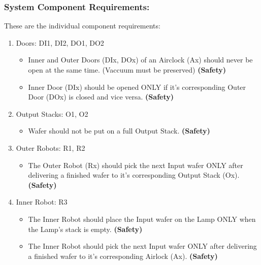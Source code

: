 \documentclass[a4paper,12pt]{article}
\begin{document}
\subsubsection{System Component Requirements:}
These are the individual component requirements:
\begin{enumerate}
\item Doors: DI1, DI2, DO1, DO2
	\begin{itemize}
	\item Inner and Outer Doors  (DIx, DOx) of an Airclock (Ax) should never be open at the same time. (Vaccuum must be preserved) \textbf{ (Safety)}
	\item Inner Door (DIx) should be opened ONLY if it's corresponding Outer Door (DOx) is closed and vice versa. \textbf{ (Safety)}
	\end{itemize}

\item Output Stacks: O1, O2
	\begin{itemize}
	\item Wafer should not be put on a full Output Stack.\textbf{ (Safety)}
	\end{itemize}

\item Outer Robots: R1, R2
	\begin{itemize}
	\item The Outer Robot (Rx) should pick the next Input wafer ONLY after delivering a finished wafer to it's corresponding Output Stack (Ox).\textbf{ (Safety)}
	\end{itemize}

\item Inner Robot: R3
	\begin{itemize}
	\item The Inner Robot should place the Input wafer on the Lamp ONLY when the Lamp's stack is empty.\textbf{ (Safety)}
	\item The Inner Robot should pick the next Input wafer ONLY after delivering a finished wafer to it's corresponding Airlock (Ax).\textbf{ (Safety)}
	\end{itemize}

\end{enumerate}
\end{document}
